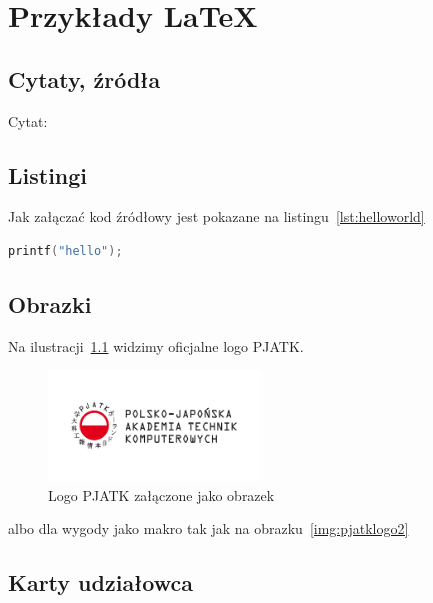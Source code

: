 
\chapter{Przykłady LaTeX}
\label{ch:przykady-latex}

\section{Cytaty, źródła}
\label{sec:cytaty-zroda}
Cytat: \cite{bla}

\section{Listingi}
\label{sec:listingi}
Jak załączać kod źródłowy jest pokazane na listingu~\ref{lst:helloworld}

\begin{lstlisting}[language=c,caption={Przykładowy witaj w świecie}, label={lst:helloworld}]
printf("hello");
\end{lstlisting}

\section{Obrazki}
\label{sec:obrazki}

Na ilustracji~\ref{fig:pjatklogo} widzimy oficjalne logo PJATK\@.

\begin{figure}[h]
    \centering
    \includegraphics[width=0.5\textwidth]{attachments/pjatk}
    \caption{Logo PJATK załączone jako obrazek}
    \label{fig:pjatklogo}
\end{figure}

albo dla wygody jako makro tak jak na obrazku~\ref{img:pjatklogo2}


\section{Karty udziałowca}
\label{sec:karty-udziaowca}

